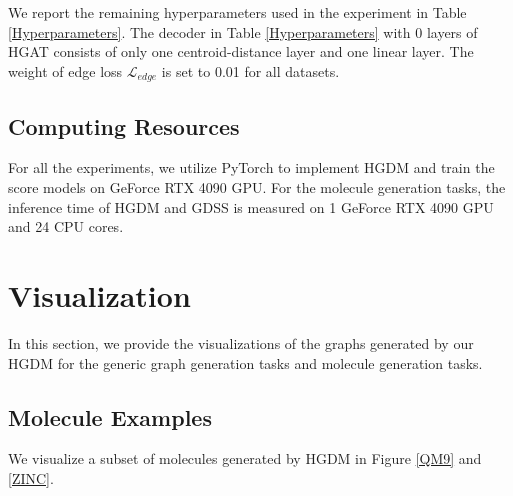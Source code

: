 \documentclass[letterpaper]{article} %
\begin{document}
We report the remaining hyperparameters used in the experiment in Table \ref{Hyperparameters}. The decoder in Table \ref{Hyperparameters} with 0 layers of HGAT consists of only one centroid-distance layer \cite{liu2019hyperbolic} and one linear layer. The weight of edge loss $\mathcal{L}_{\textit{edge}}$ is set to 0.01 for all datasets.

\subsection{Computing Resources}
For all the experiments, we utilize PyTorch \cite{paszke2019pytorch} to implement HGDM and train the score models on GeForce RTX 4090 GPU. For the molecule generation tasks, the inference time of HGDM and GDSS is measured on 1 GeForce RTX 4090 GPU and 24 CPU cores.

\section{Visualization}
In this section, we provide the visualizations of the graphs generated by our HGDM for the generic graph generation tasks and molecule generation tasks.

\subsection{Molecule Examples}
We visualize a subset of molecules generated by HGDM in Figure \ref{QM9} and \ref{ZINC}.
\end{document}
